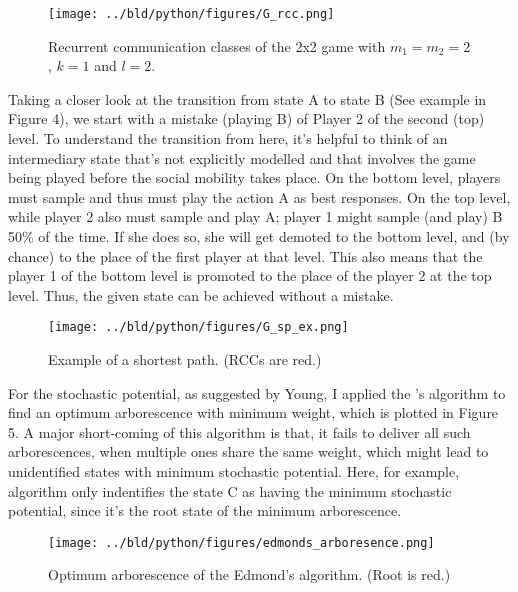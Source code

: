 \documentclass[11pt, a4paper, leqno]{article}
\begin{document}
\begin{figure}
            \centering
            \texttt{[image: ../bld/python/figures/G\_rcc.png]}
            \caption{Recurrent communication classes of the 2x2 game with $m_1=m_2=2$, $k=1$ and $l=2$.}
            \label{fig:rcc}
        \end{figure}

        

Taking a closer look at the transition from state A to state B (See example in Figure 4), we start with a mistake (playing B) of Player 2 of the second (top) level. To understand the transition from here, it's helpful to think of an intermediary state that's not explicitly modelled and that involves the game being played before the social mobility takes place. On the bottom level, players must sample and thus must play the action A as best responses. On the top level, while player 2 also must sample and play A; player 1 might sample (and play) B 50\% of the time. If she does so, she will get demoted to the bottom level, and (by chance) to the place of the first player at that level. This also means that the player 1 of the bottom level is promoted to the place of the player 2 at the top level. Thus, the given state can be achieved without a mistake.

\begin{figure}
    \centering
    \texttt{[image: ../bld/python/figures/G\_sp\_ex.png]}
    \caption{Example of a shortest path. (RCCs are red.)}
    \label{fig:sp}
\end{figure}



For the stochastic potential, as suggested by Young, I applied the 
\citet{edmonds1967optimum}'s algorithm to find an optimum arborescence 
with minimum weight, which is plotted in Figure 5. A major short-coming of 
this algorithm is that, it fails to deliver all such arborescences, when 
multiple ones share the same weight, which might lead to unidentified states 
with minimum stochastic potential. Here, for example, algorithm only indentifies 
the state C as having the minimum stochastic potential, since it's the root state 
of the minimum arborescence.

\begin{figure}
    \centering
    \texttt{[image: ../bld/python/figures/edmonds\_arboresence.png]}
    \caption{Optimum arborescence of the Edmond's algorithm. (Root is red.)}
    \label{fig:arb}
\end{figure}
\end{document}
